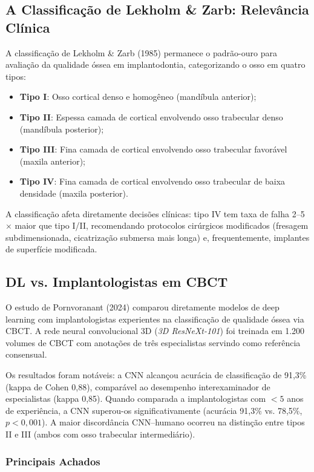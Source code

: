 \subsection{A Classificação de Lekholm \& Zarb: Relevância Clínica}

A classificação de Lekholm \& Zarb (1985) permanece o padrão-ouro para avaliação da qualidade óssea em implantodontia, categorizando o osso em quatro tipos:
\begin{itemize}
    \item \textbf{Tipo I}: Osso cortical denso e homogêneo (mandíbula anterior);
    \item \textbf{Tipo II}: Espessa camada de cortical envolvendo osso trabecular denso (mandíbula posterior);
    \item \textbf{Tipo III}: Fina camada de cortical envolvendo osso trabecular favorável (maxila anterior);
    \item \textbf{Tipo IV}: Fina camada de cortical envolvendo osso trabecular de baixa densidade (maxila posterior).
\end{itemize}

A classificação afeta diretamente decisões clínicas: tipo IV tem taxa de falha 2--5$\times$ maior que tipo I/II, recomendando protocolos cirúrgicos modificados (fresagem subdimensionada, cicatrização submersa mais longa) e, frequentemente, implantes de superfície modificada.

\subsection{DL vs. Implantologistas em CBCT}

O estudo de Pornvoranant (2024) comparou diretamente modelos de deep learning com implantologistas experientes na classificação de qualidade óssea via CBCT. A rede neural convolucional 3D (\textit{3D ResNeXt-101}) foi treinada em 1.200 volumes de CBCT com anotações de três especialistas servindo como referência consensual.

Os resultados foram notáveis: a CNN alcançou acurácia de classificação de 91,3\% (kappa de Cohen 0,88), comparável ao desempenho interexaminador de especialistas (kappa 0,85). Quando comparada a implantologistas com $< 5$ anos de experiência, a CNN superou-os significativamente (acurácia 91,3\% vs. 78,5\%, $p < 0,001$). A maior discordância CNN--humano ocorreu na distinção entre tipos II e III (ambos com osso trabecular intermediário).

\subsubsection{Principais Achados}

